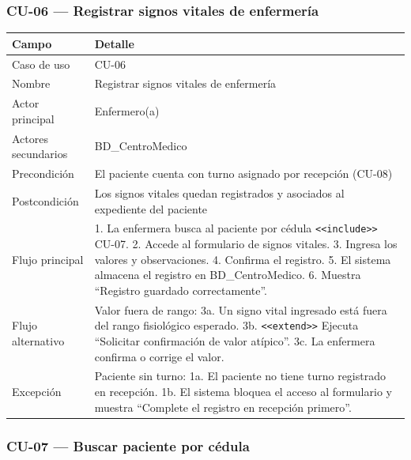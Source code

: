 \documentclass[11pt,a4paper]{article}
\begin{document}
	\subsubsection{CU-06 --- Registrar signos vitales de enfermería}
	
	\begin{longtable}{p{} p{} }
		
		
		\toprule
		\textbf{Campo} &
		\textbf{Detalle}  \\
		\midrule
		\endhead
		
		Caso de uso & CU-06 \\
		Nombre & Registrar signos vitales de enfermería \\
		Actor principal & Enfermero(a) \\
		Actores secundarios & BD\_CentroMedico \\
		Precondición & El paciente cuenta con turno asignado por recepción (CU-08) \\
		Postcondición & Los signos vitales quedan registrados y asociados al expediente del paciente \\
		Flujo principal & 1. La enfermera busca al paciente por cédula \texttt{<<include>>} CU-07. 2. Accede al formulario de signos vitales. 3. Ingresa los valores y observaciones. 4. Confirma el registro. 5. El sistema almacena el registro en BD\_CentroMedico. 6. Muestra ``Registro guardado correctamente''. \\
		Flujo alternativo & Valor fuera de rango: 3a. Un signo vital ingresado está fuera del rango fisiológico esperado. 3b. \texttt{<<extend>>} Ejecuta ``Solicitar confirmación de valor atípico''. 3c. La enfermera confirma o corrige el valor. \\
		Excepción & Paciente sin turno: 1a. El paciente no tiene turno registrado en recepción. 1b. El sistema bloquea el acceso al formulario y muestra ``Complete el registro en recepción primero''. \\
		\bottomrule
	\end{longtable}
	
	\subsubsection{CU-07 --- Buscar paciente por cédula}
	
\end{document}
